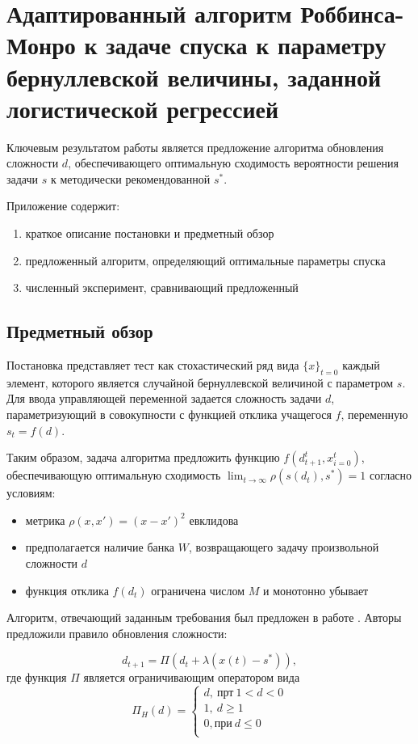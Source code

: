 \documentclass{mipt-thesis-bs}
\begin{document}
\chapter{Адаптированный алгоритм Роббинса-Монро к задаче спуска к параметру бернуллевской величины, заданной логистической регрессией}


Ключевым результатом работы является предложение алгоритма обновления сложности $d$, обеспечивающего оптимальную сходимость вероятности решения задачи $s$ к методически рекомендованной $s^*$.

Приложение содержит: \begin{enumerate}
    \item краткое описание постановки и предметный обзор
    \item предложенный алгоритм, определяющий оптимальные параметры спуска  
    \item численный эксперимент, сравнивающий предложенный 
\end{enumerate} 

\section{Предметный обзор}

Постановка представляет тест как стохастический ряд вида $\{x\}_{t=0}$ каждый элемент, которого является случайной бернуллевской величиной с параметром $s$. 
Для ввода управляющей переменной задается сложность задачи $d$, параметризующий в совокупности с функцией отклика учащегося $f$, переменную $s_t = f(d)$.

 Таким образом, задача алгоритма предложить функцию $f(d_{t+1}^t,{x}_{i=0}^t)$, обеспечивающую оптимальную сходимость $\lim_{t \rightarrow \infty} \rho(s(d_t),s^*) =1$ согласно условиям:
 \begin{itemize}
    \item метрика $\rho(x,x') = (x-x')^2$ евклидова
    \item предполагается наличие банка $W$, возвращающего задачу произвольной сложности $d$
    \item функция отклика $f(d_t)$ ограничена числом $M$ и монотонно убывает
\end{itemize}

Алгоритм, отвечающий заданным требования  был предложен в работе \cite{yazidi2020balanced}. Авторы предложили правило обновления сложности:

\begin{equation}
    d_{t+1} = \Pi(d_t+\lambda (x(t) -s^*)),
    \label{yazidi}
\end{equation}
где функция $\Pi$ является ограничивающим оператором вида
\begin{equation}
    \Pi_H(d) = \left\{
        \begin{array}{ll}
            d,\ \text{прт}\ 1<d<0 \\
            1,\ d\ge 1\\
            0, \text{при} \ d \le 0\\
        \end{array}
    \right.
\end{equation}
\end{document}
